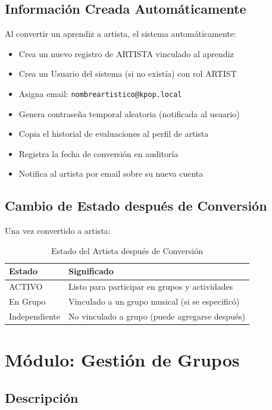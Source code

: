 \documentclass[12pt,a4paper,spanish,oneside]{report}
\begin{document}
\section{Información Creada Automáticamente}

Al convertir un aprendiz a artista, el sistema automáticamente:

\begin{itemize}
\item Crea un nuevo registro de ARTISTA vinculado al aprendiz
\item Crea un Usuario del sistema (si no existía) con rol ARTIST
\item Asigna email: \texttt{nombreartistico@kpop.local}
\item Genera contraseña temporal aleatoria (notificada al usuario)
\item Copia el historial de evaluaciones al perfil de artista
\item Registra la fecha de conversión en auditoría
\item Notifica al artista por email sobre su nueva cuenta
\end{itemize}

\section{Cambio de Estado después de Conversión}

Una vez convertido a artista:

\begin{table}[H]
\centering
\caption{Estado del Artista después de Conversión}
\begin{tabular}{|l|p{8cm}|}
\hline
\textbf{Estado} & \textbf{Significado} \\
\hline
ACTIVO & Listo para participar en grupos y actividades \\
\hline
En Grupo & Vinculado a un grupo musical (si se especificó) \\
\hline
Independiente & No vinculado a grupo (puede agregarse después) \\
\hline
\end{tabular}
\end{table}

\chapter{Módulo: Gestión de Grupos}

\section{Descripción}
\end{document}
